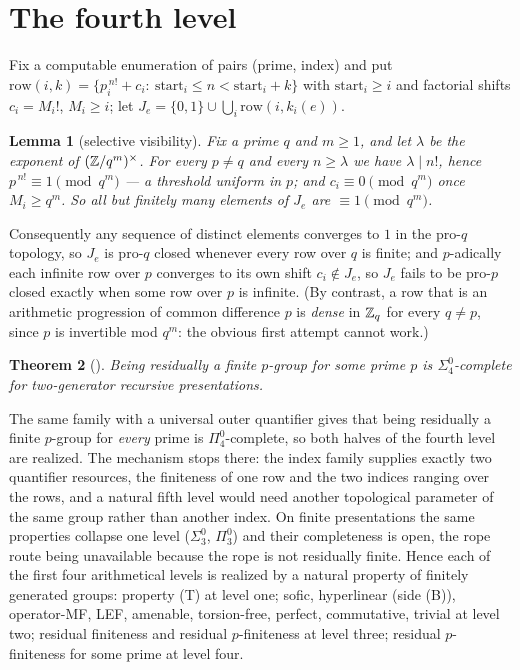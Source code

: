 \documentclass[11pt]{article}
\newtheorem{theorem}{Theorem}[section]
\newtheorem{lemma}[theorem]{Lemma}
\theoremstyle{definition}
\begin{document}
\section{The fourth level}
Fix a computable enumeration of pairs (prime, index) and put $\mathrm{row}(i,k)=\{p_i^{\,n!}+c_i:\ \mathrm{start}_i\le n<\mathrm{start}_i+k\}$ with $\mathrm{start}_i\ge i$ and factorial shifts $c_i=M_i!$, $M_i\ge i$; let $J_e=\{0,1\}\cup\bigcup_i\mathrm{row}(i,k_i(e))$.
\begin{lemma}[selective visibility]
Fix a prime $q$ and $m\ge1$, and let $\lambda$ be the exponent of $(\mathbb Z/q^m)^\times$. For every $p\ne q$ and every $n\ge\lambda$ we have $\lambda\mid n!$, hence $p^{\,n!}\equiv1\pmod{q^m}$ --- a threshold uniform in $p$; and $c_i\equiv0\pmod{q^m}$ once $M_i\ge q^m$. So all but finitely many elements of $J_e$ are $\equiv1\pmod{q^m}$.
\end{lemma}
Consequently any sequence of distinct elements converges to $1$ in the pro-$q$ topology, so $J_e$ is pro-$q$ closed whenever every row over $q$ is finite; and $p$-adically each infinite row over $p$ converges to its own shift $c_i\notin J_e$, so $J_e$ fails to be pro-$p$ closed exactly when some row over $p$ is infinite. (By contrast, a row that is an arithmetic progression of common difference $p$ is \emph{dense} in $\mathbb Z_q$ for every $q\ne p$, since $p$ is invertible mod $q^m$: the obvious first attempt cannot work.)
\begin{theorem}[]
Being residually a finite $p$-group for \emph{some} prime $p$ is $\Sigma^0_4$-complete for two-generator recursive presentations.
\end{theorem}
The same family with a universal outer quantifier gives that being residually a finite $p$-group for \emph{every} prime is $\Pi^0_4$-complete, so both halves of the fourth level are realized. The mechanism stops there: the index family supplies exactly two quantifier resources, the finiteness of one row and the two indices ranging over the rows, and a natural fifth level would need another topological parameter of the same group rather than another index. On finite presentations the same properties collapse one level ($\Sigma^0_3$, $\Pi^0_3$) and their completeness is open, the rope route being unavailable because the rope is not residually finite. Hence each of the first four arithmetical levels is realized by a natural property of finitely generated groups: property (T) at level one; sofic, hyperlinear (side (B)), operator-MF, LEF, amenable, torsion-free, perfect, commutative, trivial at level two; residual finiteness and residual $p$-finiteness at level three; residual $p$-finiteness for some prime at level four.
\end{document}
